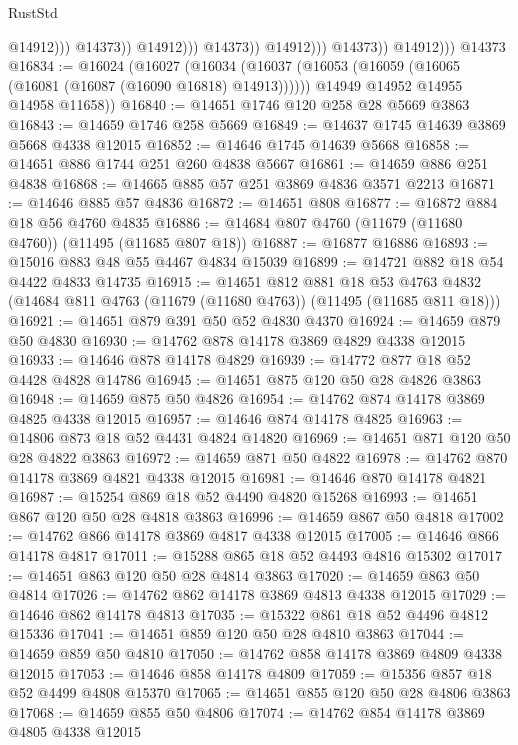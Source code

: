 \begin{lexlean}{RustStd}
\begin{coremodule}
                                        @14912)))
                                  @14373))
                              @14912)))
                        @14373))
                    @14912)))
              @14373))
          @14912)))
    @14373
@16834 := @16024
    (@16027
      (@16034
        (@16037 (@16053 (@16059 (@16065 (@16081 (@16087 (@16090 @16818) @14913))))))
        @14949
        @14952
        @14955
        @14958
        @11658))
@16840 := @14651 @1746 @120 @258 @28 @5669 @3863
@16843 := @14659 @1746 @258 @5669
@16849 := @14637 @1745 @14639 @3869 @5668 @4338 @12015
@16852 := @14646 @1745 @14639 @5668
@16858 := @14651 @886 @1744 @251 @260 @4838 @5667
@16861 := @14659 @886 @251 @4838
@16868 := @14665 @885 @57 @251 @3869 @4836 @3571 @2213
@16871 := @14646 @885 @57 @4836
@16872 := @14651 @808
@16877 := @16872 @884 @18 @56 @4760 @4835
@16886 := @14684 @807 @4760 (@11679 (@11680 @4760)) (@11495 (@11685 @807 @18))
@16887 := @16877 @16886
@16893 := @15016 @883 @48 @55 @4467 @4834 @15039
@16899 := @14721 @882 @18 @54 @4422 @4833 @14735
@16915 := @14651
    @812
    @881
    @18
    @53
    @4763
    @4832
    (@14684 @811 @4763 (@11679 (@11680 @4763)) (@11495 (@11685 @811 @18)))
@16921 := @14651 @879 @391 @50 @52 @4830 @4370
@16924 := @14659 @879 @50 @4830
@16930 := @14762 @878 @14178 @3869 @4829 @4338 @12015
@16933 := @14646 @878 @14178 @4829
@16939 := @14772 @877 @18 @52 @4428 @4828 @14786
@16945 := @14651 @875 @120 @50 @28 @4826 @3863
@16948 := @14659 @875 @50 @4826
@16954 := @14762 @874 @14178 @3869 @4825 @4338 @12015
@16957 := @14646 @874 @14178 @4825
@16963 := @14806 @873 @18 @52 @4431 @4824 @14820
@16969 := @14651 @871 @120 @50 @28 @4822 @3863
@16972 := @14659 @871 @50 @4822
@16978 := @14762 @870 @14178 @3869 @4821 @4338 @12015
@16981 := @14646 @870 @14178 @4821
@16987 := @15254 @869 @18 @52 @4490 @4820 @15268
@16993 := @14651 @867 @120 @50 @28 @4818 @3863
@16996 := @14659 @867 @50 @4818
@17002 := @14762 @866 @14178 @3869 @4817 @4338 @12015
@17005 := @14646 @866 @14178 @4817
@17011 := @15288 @865 @18 @52 @4493 @4816 @15302
@17017 := @14651 @863 @120 @50 @28 @4814 @3863
@17020 := @14659 @863 @50 @4814
@17026 := @14762 @862 @14178 @3869 @4813 @4338 @12015
@17029 := @14646 @862 @14178 @4813
@17035 := @15322 @861 @18 @52 @4496 @4812 @15336
@17041 := @14651 @859 @120 @50 @28 @4810 @3863
@17044 := @14659 @859 @50 @4810
@17050 := @14762 @858 @14178 @3869 @4809 @4338 @12015
@17053 := @14646 @858 @14178 @4809
@17059 := @15356 @857 @18 @52 @4499 @4808 @15370
@17065 := @14651 @855 @120 @50 @28 @4806 @3863
@17068 := @14659 @855 @50 @4806
@17074 := @14762 @854 @14178 @3869 @4805 @4338 @12015

\end{coremodule}
\end{lexlean}
